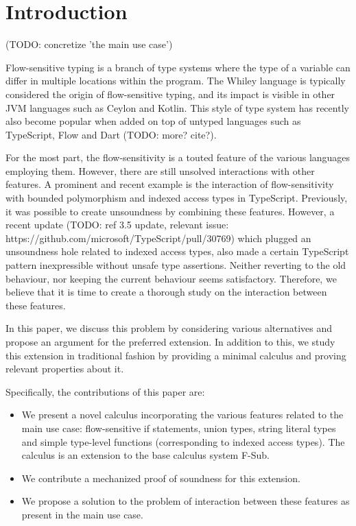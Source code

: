 \section{Introduction}
\label{sec:intro}

(TODO: concretize 'the main use case')

Flow-sensitive typing is a branch of type systems where the type of a variable can differ in multiple locations within the program. The Whiley language is typically considered the origin of flow-sensitive typing, and its impact is visible in other JVM languages such as Ceylon and Kotlin. This style of type system has recently also become popular when added on top of untyped languages such as TypeScript, Flow and Dart (TODO: more? cite?).

For the most part, the flow-sensitivity is a touted feature of the various languages employing them. However, there are still unsolved interactions with other features. A prominent and recent example is the interaction of flow-sensitivity with bounded polymorphism and indexed access types in TypeScript. Previously, it was possible to create unsoundness by combining these features. However, a recent update (TODO: ref 3.5 update, relevant issue: https://github.com/microsoft/TypeScript/pull/30769) which plugged an unsoundness hole related to indexed access types, also made a certain TypeScript pattern inexpressible without unsafe type assertions. Neither reverting to the old behaviour, nor keeping the current behaviour seems satisfactory. Therefore, we believe that it is time to create a thorough study on the interaction between these features.

In this paper, we discuss this problem by considering various alternatives and propose an argument for the preferred extension. In addition to this, we study this extension in traditional fashion by providing a minimal calculus and proving relevant properties about it.

Specifically, the contributions of this paper are:

\begin{itemize}
\item We present a novel calculus incorporating the various features related to the main use case: flow-sensitive if statements, union types, string literal types and simple type-level functions (corresponding to indexed access types). The calculus is an extension to the base calculus system F-Sub.
\item We contribute a mechanized proof of soundness for this extension.
\item We propose a solution to the problem of interaction between these features as present in the main use case.
\end{itemize}

